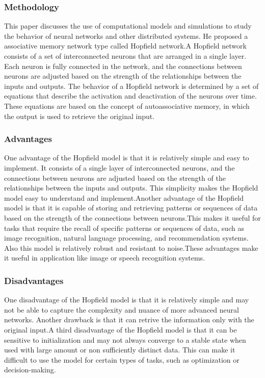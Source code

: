 \subsubsection{Methodology}
This paper discusses the use of computational models and simulations to study
the behavior of neural networks and other distributed systems. He proposed a
associative memory network type called Hopfield network.A Hopfield network
consists of a set of interconnected neurons that are arranged in a single
layer. Each neuron is fully connected in the network, and the connections
between neurons are adjusted based on the strength of the relationships between
the inputs and outputs. The behavior of a Hopfield network is determined by a
set of equations that describe the activation and deactivation of the neurons
over time. These equations are based on the concept of autoassociative memory,
in which the output is used to retrieve the original input.
\subsubsection{Advantages}
One advantage of the Hopfield model is that it is relatively simple and easy to
implement. It consists of a single layer of interconnected neurons, and the
connections between neurons are adjusted based on the strength of the
relationships between the inputs and outputs. This simplicity makes the
Hopfield model easy to understand and implement.Another advantage of the
Hopfield model is that it is capable of storing and retrieving patterns or
sequences of data based on the strength of the connections between neurons.This
makes it useful for tasks that require the recall of specific patterns or
sequences of data, such as image recognition, natural language processing, and
recommendation systems. Also this model is relatively robust and resistant to
noise.These advantages make it useful in application like image or speech
recognition systems.
\subsubsection{Disadvantages}
One disadvantage of the Hopfield model is that it is relatively simple and may
not be able to capture the complexity and nuance of more advanced neural
networks. Another drawback is that it can retrive the information only with the
original input.A third disadvantage of the Hopfield model is that it can be
sensitive to initialization and may not always converge to a stable state when
used with large amount or non sufficiently distinct data. This can make it
difficult to use the model for certain types of tasks, such as optimization or
decision-making.
